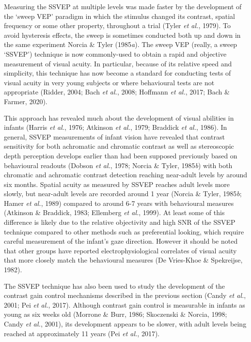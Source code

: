 \documentclass[
  letterpaper,
  DIV=11,
  numbers=noendperiod]{scrartcl}
\begin{document}
Measuring the SSVEP at multiple levels was made faster by the
development of the `sweep VEP' paradigm in which the stimulus changed
its contrast, spatial frequency or some other property, throughout a
trial (Tyler \emph{et al.}, 1979). To avoid hysteresis effects, the
sweep is sometimes conducted both up and down in the same experiment
Norcia \& Tyler (1985\emph{a}). The sweep VEP (really, a sweep `SSVEP')
technique is now commonly-used to obtain a rapid and objective
measurement of visual acuity. In particular, because of its relative
speed and simplicity, this technique has now become a standard for
conducting tests of visual acuity in very young subjects or where
behavioural tests are not appropriate (Ridder, 2004; Bach \emph{et al.},
2008; Hoffmann \emph{et al.}, 2017; Bach \& Farmer, 2020).

This approach has revealed much about the development of visual
abilities in infants (Harris \emph{et al.}, 1976; Atkinson \emph{et
al.}, 1979; Braddick \emph{et al.}, 1986). In general, SSVEP
measurements of infant vision have revealed that contrast sensitivity
for both achromatic and chromatic contrast as well as stereoscopic depth
perception develops earlier than had been supposed previously based on
behavioural readouts (Dobson \emph{et al.}, 1978; Norcia \& Tyler,
1985\emph{b}) with both chromatic and achromatic contrast detection
reaching near-adult levels by around six months. Spatial acuity as
measured by SSVEP reaches adult levels more slowly, but near-adult
levels are recorded around 1 year (Norcia \& Tyler, 1985\emph{b}; Hamer
\emph{et al.}, 1989) compared to around 6-7 years with behavioural
measures (Atkinson \& Braddick, 1983; Ellemberg \emph{et al.}, 1999). At
least some of this difference is likely due to the relative objectivity
and high SNR of the SSVEP technique compared to other methods such as
preferential looking, which require careful measurement of the infant's
gaze direction. However it should be noted that other groups have
reported electrophysiological correlates of visual acuity that more
closely match the behavioural measures (De Vries-Khoe \& Spekreijse,
1982).

The SSVEP technique has also been used to study the development of the
contrast gain control mechanisms described in the previous section
(Candy \emph{et al.}, 2001; Pei \emph{et al.}, 2017). Although contrast
gain control is measurable in infants as young as six weeks old (Morrone
\& Burr, 1986; Skoczenski \& Norcia, 1998; Candy \emph{et al.}, 2001),
its development appears to be slower, with adult levels being reached at
approximately 11 years (Pei \emph{et al.}, 2017).
\end{document}
